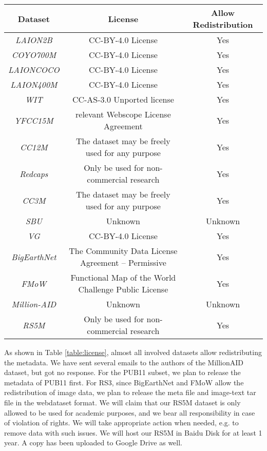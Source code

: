 \documentclass[journal]{IEEEtran}
\begin{document}
\begin{table*}[htbp]
\caption{License for data source of RS5M}
\label{table:license}
\centering {} 
\begin{tabular}{|c|c|c|}\hline
Dataset & License & Allow Redistribution \\ \hline
\textit{LAION2B} &  CC-BY-4.0 License & Yes \\
\textit{COYO700M} & CC-BY-4.0 License & Yes\\
\textit{LAIONCOCO} &  CC-BY-4.0 License & Yes \\
\textit{LAION400M} &  CC-BY-4.0 License & Yes \\
\textit{WIT} & CC-AS-3.0 Unported license & Yes \\
\textit{YFCC15M} & relevant Webscope License Agreement & Yes \\
\textit{CC12M} & The dataset may be freely used for any purpose & Yes\\
\textit{Redcaps} & Only be used for non-commercial research & Yes\\
\textit{CC3M}  & The dataset may be freely used for any purpose & Yes  \\
\textit{SBU}  & Unknown & Unknown\\
\textit{VG}  & CC-BY-4.0 License & Yes\\ 
\textit{BigEarthNet} & The Community Data License Agreement – Permissive & Yes\\
\textit{FMoW}  & Functional Map of the World Challenge Public License & Yes\\
\textit{Million-AID}  & Unknown & Unknown\\ 
\textit{RS5M}  & Only be used for non-commercial research  & Yes\\ \hline

\end{tabular}
\end{table*}

As shown in Table \ref{table:license}, almost all involved datasets allow redistributing the metadata. We have sent several emails to the authors of the MillionAID dataset, but got no response. For the PUB11 subset, we plan to release the metadata of PUB11 first. For RS3, since BigEarthNet and FMoW allow the redistribution of image data, we plan to release the meta file and image-text tar file in the webdataset format. We will claim that our RS5M dataset is only allowed to be used for academic purposes, and we bear all responsibility in case of violation of rights. We will take appropriate action when needed, e.g. to remove data with such issues. We will host our RS5M in Baidu Disk for at least 1 year. A copy has been uploaded to Google Drive as well.
\end{document}
